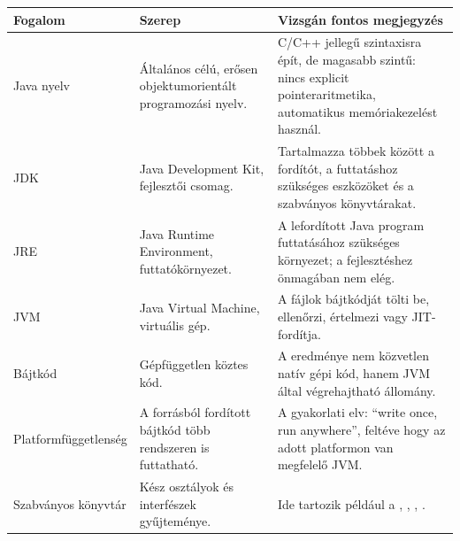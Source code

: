 \begin{tabularx}{\textwidth}{L{28mm}L{38mm}X}
\toprule
\textbf{Fogalom} & \textbf{Szerep} & \textbf{Vizsgán fontos megjegyzés} \\
\midrule
Java nyelv & Általános célú, erősen objektumorientált programozási nyelv. & C/C++ jellegű szintaxisra épít, de magasabb szintű: nincs explicit pointeraritmetika, automatikus memóriakezelést használ. \\
JDK & Java Development Kit, fejlesztői csomag. & Tartalmazza többek között a  fordítót, a futtatáshoz szükséges eszközöket és a szabványos könyvtárakat. \\
JRE & Java Runtime Environment, futtatókörnyezet. & A lefordított Java program futtatásához szükséges környezet; a fejlesztéshez önmagában nem elég. \\
JVM & Java Virtual Machine, virtuális gép. & A  fájlok bájtkódját tölti be, ellenőrzi, értelmezi vagy JIT-fordítja. \\
Bájtkód & Gépfüggetlen köztes kód. & A  eredménye nem közvetlen natív gépi kód, hanem JVM által végrehajtható  állomány. \\
Platformfüggetlenség & A forrásból fordított bájtkód több rendszeren is futtatható. & A gyakorlati elv: ``write once, run anywhere'', feltéve hogy az adott platformon van megfelelő JVM. \\
Szabványos könyvtár & Kész osztályok és interfészek gyűjteménye. & Ide tartozik például a , , , . \\
\bottomrule
\end{tabularx}
